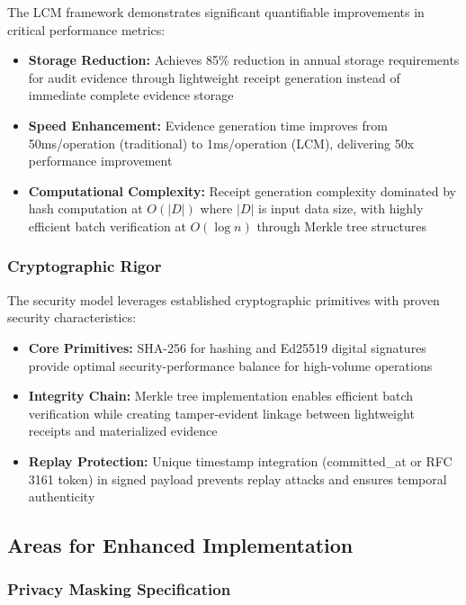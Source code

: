 \documentclass[12pt,a4paper]{article}
\begin{document}
The LCM framework demonstrates significant quantifiable improvements in critical performance metrics:

\begin{itemize}
\item \textbf{Storage Reduction:} Achieves 85\% reduction in annual storage requirements for audit evidence through lightweight receipt generation instead of immediate complete evidence storage
\item \textbf{Speed Enhancement:} Evidence generation time improves from 50ms/operation (traditional) to 1ms/operation (LCM), delivering 50x performance improvement
\item \textbf{Computational Complexity:} Receipt generation complexity dominated by hash computation at $O(|D|)$ where $|D|$ is input data size, with highly efficient batch verification at $O(\log n)$ through Merkle tree structures
\end{itemize}

\subsubsection{Cryptographic Rigor}

The security model leverages established cryptographic primitives with proven security characteristics:

\begin{itemize}
\item \textbf{Core Primitives:} SHA-256 for hashing and Ed25519 digital signatures provide optimal security-performance balance for high-volume operations
\item \textbf{Integrity Chain:} Merkle tree implementation enables efficient batch verification while creating tamper-evident linkage between lightweight receipts and materialized evidence
\item \textbf{Replay Protection:} Unique timestamp integration (committed\_at or RFC 3161 token) in signed payload prevents replay attacks and ensures temporal authenticity
\end{itemize}

\subsection{Areas for Enhanced Implementation}

\subsubsection{Privacy Masking Specification}
\end{document}
